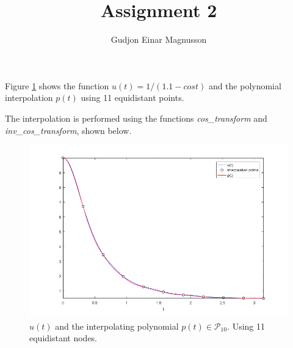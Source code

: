 \documentclass[12pt]{article}
\begin{document}
\title{Assignment 2}
\author{Gudjon Einar Magnusson}

\maketitle


\section{} %

\subsection{} %

Figure \ref{fig_ut_pt} shows the function $u(t) = 1/(1.1 - cos t)$ and the polynomial interpolation $p(t)$ using 11 equidistant points.

The interpolation is performed using the functions \textit{cos\_transform} and \textit{inv\_cos\_transform}, shown below.

\noindent
\begin{minipage}{\linewidth}

\end{minipage}

\noindent
\begin{minipage}{\linewidth}

\end{minipage}

\begin{figure}
    \includegraphics[width=0.6\linewidth]{ut_pt}
    \centering
    \caption{$u(t)$ and the interpolating polynomial $p(t) \in \mathcal{P}_{10}$. Using 11 equidistant nodes.}
    \label{fig_ut_pt}    
\end{figure}


\subsection{} %
\end{document}
